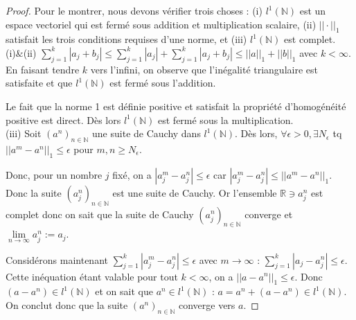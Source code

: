 \begin{proof}
    Pour le montrer, nous devons vérifier trois choses : (i) $l^1(\mathbb{N})$ est un espace vectoriel qui est fermé sous addition et multiplication scalaire, (ii) $||\cdot||_1$ satisfait les trois conditions requises d'une norme, et (iii) $l^1(\mathbb{N})$ est complet.\\
    
    (i)$\&$(ii) $\sum \limits_{j=1}^k |a_j+b_j| \leq \sum \limits_{j=1}^k |a_j| + \sum \limits_{j=1}^k |a_j+b_j| \leq ||a||_1 + ||b||_1$ avec $k < \infty$. En faisant tendre $k$ vers l'infini, on observe que l'inégalité triangulaire est satisfaite et que $l^1(\mathbb{N})$ est fermé sous l'addition.
    
    Le fait que la norme 1 est définie positive et satisfait la propriété d'homogénéité positive est direct. Dès lors $l^1(\mathbb{N})$ est fermé sous la multiplication.\\
    
    (iii) Soit $(a^n)_{n\in\mathbb{N}}$ une suite de Cauchy dans $l^1(\mathbb{N})$. Dès lors, $\forall \epsilon>0,\exists N_\epsilon$ tq $||a^m-a^n||_1 \leq \epsilon$ pour $m,n \geq N_\epsilon$.
    
    Donc, pour un nombre $j$ fixé, on a $|a_j^m-a_j^n|\leq\epsilon$ car $|a_j^m-a_j^n| \leq ||a^m-a^n||_1$. Donc la suite $(a^n_j)_{n\in\mathbb{N}}$ est une suite de Cauchy. Or l'ensemble $\mathbb{R} \ni a_j^n$ est complet donc on sait que la suite de Cauchy $(a^n_j)_{n\in\mathbb{N}}$ converge et $\lim \limits_{n\to\infty} a_j^n := a_j$.
    
    Considérons maintenant $\sum \limits_{j=1}^{k} |a_j^m - a_j^n| \leq \epsilon$ avec $m\rightarrow\infty$ : $\sum \limits_{j=1}^{k} |a_j - a_j^n| \leq \epsilon$. Cette inéquation étant valable pour tout $k < \infty$, on a $||a-a^n||_1\leq\epsilon$. Donc $(a-a^n) \in l^1(\mathbb{N})$ et on sait que $a^n \in l^1(\mathbb{N})$ : $a=a^n+(a-a^n) \in l^1(\mathbb{N})$. On conclut donc que la suite $(a^n)_{n\in\mathbb{N}}$ converge vers $a$.
\end{proof}

